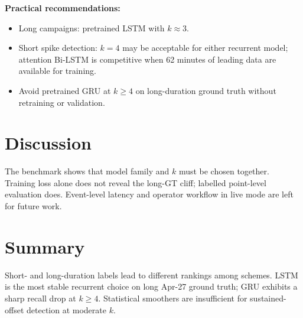 \textbf{Practical recommendations:}
\begin{itemize}
    \item Long campaigns: pretrained LSTM with $k \approx 3$.
    \item Short spike detection: $k=4$ may be acceptable for either recurrent model; attention Bi-LSTM is competitive when 62 minutes of leading data are available for training.
    \item Avoid pretrained GRU at $k \ge 4$ on long-duration ground truth without retraining or validation.
\end{itemize}

\section{Discussion}
The benchmark shows that model family and $k$ must be chosen together. Training loss alone does not reveal the long-GT cliff; labelled point-level evaluation does. Event-level latency and operator workflow in live mode are left for future work.

\section{Summary}
Short- and long-duration labels lead to different rankings among schemes. LSTM is the most stable recurrent choice on long Apr-27 ground truth; GRU exhibits a sharp recall drop at $k \ge 4$. Statistical smoothers are insufficient for sustained-offset detection at moderate $k$.
